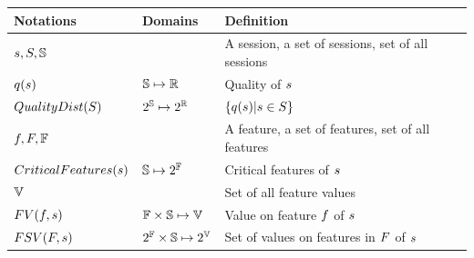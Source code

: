 \begin{table}[t!]
\begin{tabular}{p{3.5cm}|p{3cm}|p{7.5cm}}
{\bf Notations} & {\bf Domains} & {\bf Definition} \\ \hline\hline
$s,S,\mathbb{S}$ & & A session, a set of sessions, set of all sessions \\ \hline
$q(s)$ & $\mathbb{S}\mapsto\mathbb{R}$ & Quality of $s$ \\ \hline
$QualityDist(S)$ & $2^\mathbb{S}\mapsto2^\mathbb{R}$ & $\{q(s)|s\in S\}$ \\ \hline
$f,F,\mathbb{F}$ & & A feature, a set of features, set of all features \\ \hline
$CriticalFeatures(s)$ & $\mathbb{S}\mapsto2^\mathbb{F}$ & Critical features of $s$ \\ \hline
$\mathbb{V}$ & & Set of all feature values \\ \hline
$FV(f,s)$ & $\mathbb{F}\times\mathbb{S}\mapsto\mathbb{V}$ & Value on feature $f$ of $s$ \\ \hline
$FSV(F,s)$ & $2^\mathbb{F}\times\mathbb{S}\mapsto2^\mathbb{V}$ & Set of values on features in $F$ of $s$ \\ \hline

\end{tabular}
\end{table}
